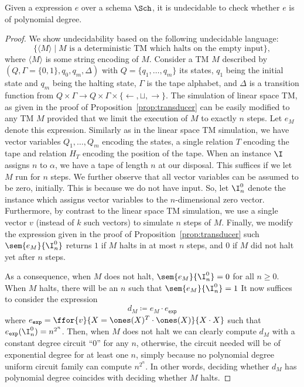 \begin{Undec}
	Given a \langfor expression $e$ over a schema $\Sch$, it is undecidable to check whether $e$ is of polynomial degree.
\end{Undec}
\begin{proof}
We show undecidability based on the following undecidable language:
$$
\{ \langle M\rangle\mid \text{$M$ is a deterministic TM which halts on the empty input}\},
$$
where $\langle M\rangle$ is some string encoding of $M$.
Consider a TM $M$ described by $(Q,\Gamma=\{0,1\},q_0,q_m,\Delta)$
with $Q=\{q_1,\ldots,q_m\}$ its states, $q_1$ being the initial state and $q_m$ being
the halting state, $\Gamma$ is the tape alphabet, and $\Delta$ is a transition function
from $Q\times \Gamma\to Q\times\Gamma\times \{\leftarrow,\sqcup,\rightarrow\}$. The simulation
of linear space TM, as given in the proof of Proposition~\ref{prop:transducer} can be easily modified to
any TM $M$ provided that we limit the execution of $M$ to exactly $n$ steps. Let $e_M$ denote this expression. Similarly
as in the linear space TM simulation, we have vector variables $Q_1,\ldots,Q_m$ encoding the
states, a single relation $T$ encoding the tape and relation $H_T$ encoding the position
of the tape.  When an instance $\I$ assigns $n$ to $\alpha$, we have a tape of length $n$ at our disposal. This suffices if we let $M$ run for $n$ steps. We further observe that all vector variables can be assumed to be zero, initially.
This is because we do not have input. So, let $\I_n^0$ denote the instance which assigns vector variables to the $n$-dimensional zero vector.  Furthermore, by contrast to the linear space TM simulation, we use a single vector $v$ (instead of $k$ such vectors) to simulate $n$ steps of $M$. Finally, we modify the expression given in the proof of Proposition~\ref{prop:transducer} such $\sem{e_M}{\I_n^0}$  returns $1$ if $M$
halts in at most $n$ steps, and $0$ if $M$ did not halt yet after $n$ steps.

As a consequence, when $M$ does not halt, $\sem{e_M}{\I_n^0}=0$ for all $n\geq 0$. When $M$ halts, there will be an $n$ such that $\sem{e_M}{\I_n^0}=1$ It now suffices to consider the \langfor expression
$$
d_M\coloneqq e_M\cdot e_{\mathsf{exp}}
$$
where $e_{\texttt{exp}} = \ffor{v}{X=\ones(X)^T\cdot\ones(X)}{X\cdot X}$ such that
$e_{\texttt{exp}}(\I_n^0)=n^{2^n}$. Then, when $M$ does not halt we can clearly compute $d_M$ with a constant degree circuit ``0''
for any $n$, otherwise, the circuit needed will be of exponential degree
for at least one $n$, simply because no polynomial degree uniform  circuit family can compute $n^{2^n}$. In other words, deciding whether $d_M$ has polynomial degree coincides with deciding whether $M$ halts.
\end{proof}


%
%
%
